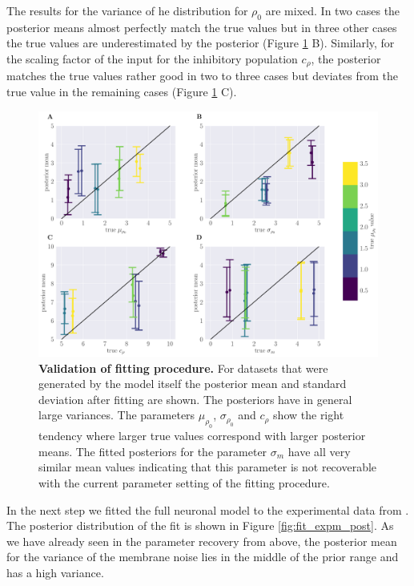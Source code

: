 \documentclass[a4paper,10pt,hidelinks]{scrreprt}
\begin{document}
    The results for the variance of he distribution for $\rho_0$ are mixed.
    In two cases the posterior means almost perfectly match the true values but in three other cases the true values are underestimated by the posterior (Figure \ref{fig:fit_validation} B).
    Similarly, for the scaling factor of the input for the inhibitory population $c_{\rho}$, the posterior matches the true values rather good in two to three cases but deviates from the true value in the remaining cases (Figure \ref{fig:fit_validation} C).\\
    \begin{figure}[H]
    	\begin{center}
			\includegraphics[width=\textwidth]{figure_fit_validation.pdf}
    	\end{center}
    	\caption{\textbf{Validation of fitting procedure.} For datasets that were generated by the model itself the posterior mean and standard deviation after fitting are shown. The posteriors have in general large variances. The parameters $\mu_{\rho_{0}}$, $\sigma_{\rho_{0}}$ and $c_{\rho}$ show the right tendency where larger true values correspond with larger posterior means. The fitted posteriors for the parameter $\sigma_{m}$ have all very similar mean values indicating that this parameter is not recoverable with the current parameter setting of the fitting procedure.}
    	\label{fig:fit_validation}
    \end{figure}
    In the next step we fitted the full neuronal model to the experimental data from \cite{Bhattacharyya2017}.
    The posterior distribution of the fit is shown in Figure \ref{fig:fit_expm_post}.
    As we have already seen in the parameter recovery from above, the posterior mean for the variance of the membrane noise lies in the middle of the prior range and has a high variance.
\end{document}
